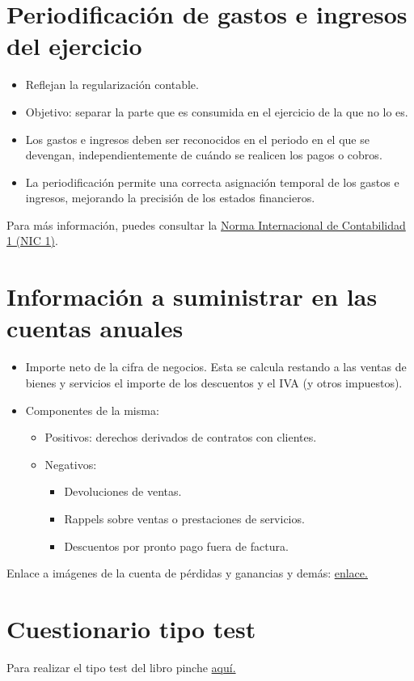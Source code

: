 \documentclass[a4paper,12pt]{article}
\begin{document}
\section{Periodificación de gastos e ingresos del ejercicio}

\begin{itemize}
    \item Reflejan la regularización contable.
    \item Objetivo: separar la parte que es consumida en el ejercicio de la que no lo es.
    \item Los gastos e ingresos deben ser reconocidos en el periodo en el que se devengan, independientemente de cuándo se realicen los pagos o cobros.
    \item La periodificación permite una correcta asignación temporal de los gastos e ingresos, mejorando la precisión de los estados financieros.
\end{itemize}

Para más información, puedes consultar la \href{https://www.ifrs.org/issued-standards/list-of-standards/ias-1-presentation-of-financial-statements/}{Norma Internacional de Contabilidad 1 (NIC 1)}.

\section{Información a suministrar en las cuentas anuales}
\begin{itemize}
    \item Importe neto de la cifra de negocios. Esta se calcula restando a las ventas de bienes y servicios el importe de los descuentos y el IVA (y otros impuestos).
    \item Componentes de la misma:
    \begin{itemize}
        \item Positivos: derechos derivados de contratos con clientes.
        \item Negativos:
        \begin{itemize}
            \item Devoluciones de ventas.
            \item Rappels sobre ventas o prestaciones de servicios.
            \item Descuentos por pronto pago fuera de factura.
        \end{itemize}
    \end{itemize}
\end{itemize}

Enlace a imágenes de la cuenta de pérdidas y ganancias y demás: \href{https://github.com/ElblogdeIsmael/ElblogdeIsmael.github.io/tree/main/Asignaturas/Tercer%20A%C3%B1o/CF1/Resumenes/Tema4/FCCEE/images/figuras}{enlace.}

\section{Cuestionario tipo test}
Para realizar el tipo test del libro pinche \href{https://elblogdeismael.github.io/Asignaturas/Tercer%20A%C3%B1o/CF1/Tests/testT4libro.html}{aquí.}
\end{document}

